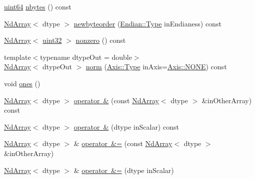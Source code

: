 \begin{DoxyCompactItemize}
\item 
\mbox{\hyperlink{namespace_num_c_a22306a0884a815781c5b147415f6d817}{uint64}} \mbox{\hyperlink{class_num_c_1_1_nd_array_a68b69a2bce03b4a10961c51fff965522}{nbytes}} () const
\item 
\mbox{\hyperlink{class_num_c_1_1_nd_array}{Nd\+Array}}$<$ dtype $>$ \mbox{\hyperlink{class_num_c_1_1_nd_array_a992b403fa64d2d3c4516b0ca9328de66}{newbyteorder}} (\mbox{\hyperlink{struct_num_c_1_1_endian_ab667001489f67f8a96f328f0a9c351fa}{Endian\+::\+Type}} in\+Endianess) const
\item 
\mbox{\hyperlink{class_num_c_1_1_nd_array}{Nd\+Array}}$<$ \mbox{\hyperlink{namespace_num_c_ae685802ca6d3035f2b400b081e3953fa}{uint32}} $>$ \mbox{\hyperlink{class_num_c_1_1_nd_array_aa0a3b09f956b37105f51728f43fedc75}{nonzero}} () const
\item 
{\footnotesize template$<$typename dtype\+Out  = double$>$ }\\\mbox{\hyperlink{class_num_c_1_1_nd_array}{Nd\+Array}}$<$ dtype\+Out $>$ \mbox{\hyperlink{class_num_c_1_1_nd_array_a47c3cf20b6d6c9836c8f44cd20db19a2}{norm}} (\mbox{\hyperlink{struct_num_c_1_1_axis_a8e689044ef1941a03482e730c5e7ebb3}{Axis\+::\+Type}} in\+Axis=\mbox{\hyperlink{struct_num_c_1_1_axis_a8e689044ef1941a03482e730c5e7ebb3a0ae033c4226f7184bf0050b101e7ed94}{Axis\+::\+N\+O\+NE}}) const
\item 
void \mbox{\hyperlink{class_num_c_1_1_nd_array_aad4dd497617c112f0651c063101abf3f}{ones}} ()
\item 
\mbox{\hyperlink{class_num_c_1_1_nd_array}{Nd\+Array}}$<$ dtype $>$ \mbox{\hyperlink{class_num_c_1_1_nd_array_a1e12ef0c840772a2d180cdf679b81297}{operator \&}} (const \mbox{\hyperlink{class_num_c_1_1_nd_array}{Nd\+Array}}$<$ dtype $>$ \&in\+Other\+Array) const
\item 
\mbox{\hyperlink{class_num_c_1_1_nd_array}{Nd\+Array}}$<$ dtype $>$ \mbox{\hyperlink{class_num_c_1_1_nd_array_ad45f32f0f838dd0eba65a867b7066b61}{operator \&}} (dtype in\+Scalar) const
\item 
\mbox{\hyperlink{class_num_c_1_1_nd_array}{Nd\+Array}}$<$ dtype $>$ \& \mbox{\hyperlink{class_num_c_1_1_nd_array_ab80433168fc9b6c44e49f68688826802}{operator \&=}} (const \mbox{\hyperlink{class_num_c_1_1_nd_array}{Nd\+Array}}$<$ dtype $>$ \&in\+Other\+Array)
\item 
\mbox{\hyperlink{class_num_c_1_1_nd_array}{Nd\+Array}}$<$ dtype $>$ \& \mbox{\hyperlink{class_num_c_1_1_nd_array_aa7d1db0e3ce1e1ac3697bde5bb61dbd5}{operator \&=}} (dtype in\+Scalar)
\item 

\end{DoxyCompactItemize}
